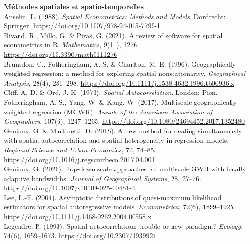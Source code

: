 \documentclass[11pt,a4paper]{article}
\begin{document}
{\small
\RaggedRight
\setlength{\parindent}{0pt}
\setlength{\parskip}{0.12cm}

\textbf{Méthodes spatiales et spatio-temporelles}\\[0.15cm]

Anselin, L. (1988). \textit{Spatial Econometrics: Methods and Models}. Dordrecht: Springer. \url{https://doi.org/10.1007/978-94-015-7799-1}\\[0.2cm]

Bivand, R., Millo, G. \& Piras, G. (2021). A review of software for spatial econometrics in R. \textit{Mathematics}, 9(11), 1276. \url{https://doi.org/10.3390/math9111276}\\[0.2cm]

Brunsdon, C., Fotheringham, A. S. \& Charlton, M. E. (1996). Geographically weighted regression: a method for exploring spatial nonstationarity. \textit{Geographical Analysis}, 28(4), 281--298. \url{https://doi.org/10.1111/j.1538-4632.1996.tb00936.x}\\[0.2cm]

Cliff, A. D. \& Ord, J. K. (1973). \textit{Spatial Autocorrelation}. London: Pion.\\[0.2cm]

Fotheringham, A. S., Yang, W. \& Kang, W. (2017). Multiscale geographically weighted regression (MGWR). \textit{Annals of the American Association of Geographers}, 107(6), 1247--1265. \url{https://doi.org/10.1080/24694452.2017.1352480}\\[0.2cm]

Geniaux, G. \& Martinetti, D. (2018). A new method for dealing simultaneously with spatial autocorrelation and spatial heterogeneity in regression models. \textit{Regional Science and Urban Economics}, 72, 74--85. \url{https://doi.org/10.1016/j.regsciurbeco.2017.04.001}\\[0.2cm]

Geniaux, G. (2026). Top-down scale approaches for multiscale GWR with locally adaptive bandwidths. \textit{Journal of Geographical Systems}, 28, 27--76. \url{https://doi.org/10.1007/s10109-025-00481-4}\\[0.2cm]

Lee, L.-F. (2004). Asymptotic distributions of quasi-maximum likelihood estimators for spatial autoregressive models. \textit{Econometrica}, 72(6), 1899--1925. \url{https://doi.org/10.1111/j.1468-0262.2004.00558.x}\\[0.2cm]

Legendre, P. (1993). Spatial autocorrelation: trouble or new paradigm? \textit{Ecology}, 74(6), 1659--1673. \url{https://doi.org/10.2307/1939924}\\[0.2cm]

}
\end{document}
